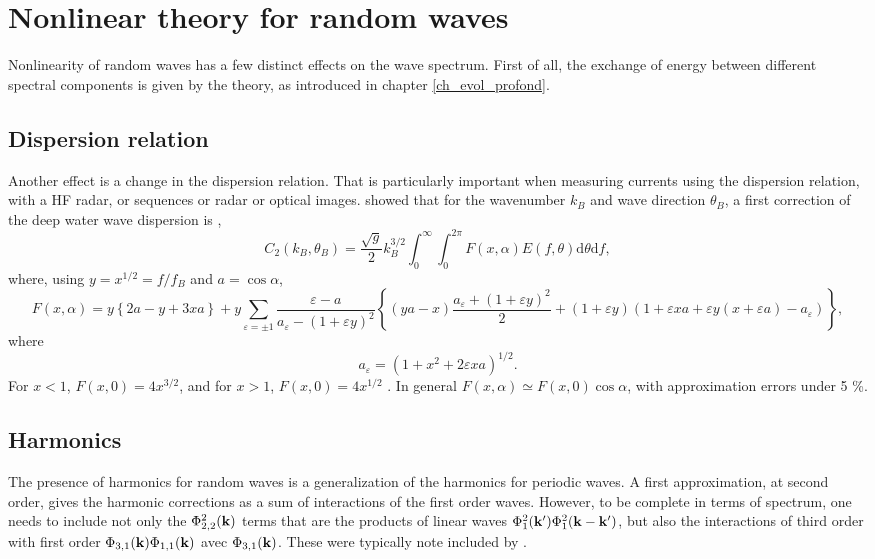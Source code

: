 \section{Nonlinear theory for random waves}\label{ch_nonlin_alea}
Nonlinearity of random waves has a few distinct effects on the wave spectrum. First of all, the exchange of
energy between different spectral components is given by the  \cite{Hasselmann1960} theory, as introduced 
in chapter \ref{ch_evol_profond}.

\subsection{Dispersion relation}
Another effect is a change in the dispersion relation. That is particularly important when measuring currents 
using the dispersion relation, with a HF radar, or sequences or radar or optical images. \cite{Barrick&Weber1977} showed that for the wavenumber 
$k_B$ and wave direction $\theta_B$, a first correction of the deep water wave dispersion is  \citep{Broche&al.1983,Ardhuin&al.2008}, 
\begin{equation}
C_{2}(k_B,\theta_B) =  \frac{\sqrt{g}}{2} k_B^{3/2}
\int_{0}^\infty \int_0^{2 \pi} F(x,\alpha) E(f,\theta) \mathrm{d}
\theta \mathrm{d} f,\nonumber  \label{UsfA2}
\end{equation}
where, using
$y=x^{1/2}=f/f_B$ and $a=\cos \alpha$, 
\begin{equation}
F(x,\alpha)=y\left\{2 a - y+3 x a \right\} + y \sum_{\varepsilon=\pm 1} \frac{\varepsilon -a}{a_\varepsilon
- \left(1 +\varepsilon y\right)^2} \left\{\left(y a -x\right)\frac{a_\varepsilon+\left(1+\varepsilon
y\right)^2}{2} +\left(1+ \varepsilon y\right) \left(1+\varepsilon x a +
\varepsilon y\left(x+\varepsilon
a\right)-a_\varepsilon\right)\right\},
\label{A1corr}
\end{equation}
where
\begin{equation}
a_\varepsilon=\left(1+x^2 + 2 \varepsilon x a \right)^{1/2}.
\end{equation}
For $x<1$,  $F(x,0)=4
x^{3/2}$, and for $x>1$, $F(x,0)=4 x^{1/2}$ \citep{Longuet-Higgins&Phillips1962}. 
In general 
$F(x,\alpha)\simeq F(x,0) \cos \alpha$, with 	approximation errors under 5 \%. 

\subsection{Harmonics}\label{random_harmonics}
The presence of harmonics for random waves is a generalization of the harmonics for periodic waves. 
A first approximation, at second order, gives the harmonic corrections as a sum of interactions of the first order waves. However, to be complete in terms of spectrum, one needs to include not only the $\Phi_{2,2}^2 (\mathbf{k})$ terms that are the products of linear waves  $\Phi_1^2 (\mathbf{k^{\prime}}) \Phi_1^2 (\mathbf{k} -\mathbf{k^{\prime}})$, but also the interactions of third order with first order $\Phi_{3,1}(\mathbf{k}) \Phi_{1,1} (\mathbf{k})$ avec $\Phi_{3,1}(\mathbf{k})$. These were typically note included by \cite{Weber&Barrick1977}. 

